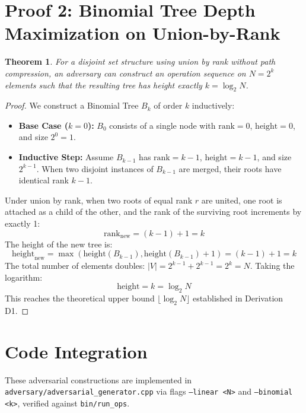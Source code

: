 \documentclass[11pt,a4paper]{article}
\newtheorem{theorem}{Theorem}
\begin{document}
\section{Proof 2: Binomial Tree Depth Maximization on Union-by-Rank}
\begin{theorem}
For a disjoint set structure using union by rank without path compression, an adversary can construct an operation sequence on $N = 2^k$ elements such that the resulting tree has height exactly $k = \log_2 N$.
\end{theorem}

\begin{proof}
We construct a Binomial Tree $B_k$ of order $k$ inductively:
\begin{itemize}
    \item \textbf{Base Case ($k=0$):} $B_0$ consists of a single node with $\text{rank} = 0$, $\text{height} = 0$, and size $2^0 = 1$.
    \item \textbf{Inductive Step:} Assume $B_{k-1}$ has $\text{rank} = k-1$, $\text{height} = k-1$, and size $2^{k-1}$. When two disjoint instances of $B_{k-1}$ are merged, their roots have identical rank $k-1$.
\end{itemize}
Under union by rank, when two roots of equal rank $r$ are united, one root is attached as a child of the other, and the rank of the surviving root increments by exactly 1:
\[
\text{rank}_{\text{new}} = (k-1) + 1 = k
\]
The height of the new tree is:
\[
\text{height}_{\text{new}} = \max(\text{height}(B_{k-1}), \text{height}(B_{k-1}) + 1) = (k-1) + 1 = k
\]
The total number of elements doubles: $|V| = 2^{k-1} + 2^{k-1} = 2^k = N$.
Taking the logarithm:
\[
\text{height} = k = \log_2 N
\]
This reaches the theoretical upper bound $\lfloor \log_2 N \rfloor$ established in Derivation D1. \qedhere
\end{proof}

\section{Code Integration}
These adversarial constructions are implemented in \texttt{adversary/adversarial\_generator.cpp} via flags \texttt{--linear <N>} and \texttt{--binomial <k>}, verified against \texttt{bin/run\_ops}.
\end{document}
